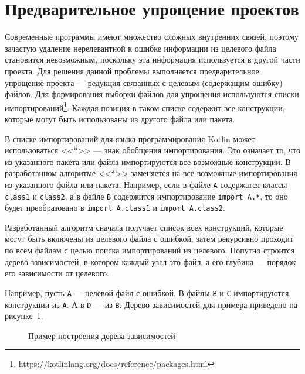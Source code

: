 \section{Предварительное упрощение проектов}
Современные программы имеют множество сложных внутренних связей, поэтому зачастую удаление нерелевантной к ошибке информации из целевого файла становится невозможным, поскольку эта информация используется в другой части проекта. Для решения данной проблемы выполняется предварительное упрощение проекта --- редукция связанных с целевым (содержащим ошибку) файлов. Для формирования выборки файлов для упрощения используются списки импортирований\footnote{https://kotlinlang.org/docs/reference/packages.html}. Каждая позиция в таком списке содержит все конструкции, которые могут быть использованы из другого файла или пакета. 

В списке импортирований для языка программирования Kotlin может использоваться <<*>> --- знак обобщения импортирования. Это означает то, что из указанного пакета или файла импортируются все возможные конструкции. В разработанном алгоритме <<*>> заменяется на все возможные импортирования из указанного файла или пакета. Например, если в файле \texttt{A} содержатся классы \texttt{class1} и \texttt{class2}, а в файле \texttt{B} содержится импортирование \texttt{import A.*}, то оно будет преобразовано в \texttt{import A.class1} и \texttt{import A.class2}. 

Разработанный алгоритм сначала получает список всех конструкций, которые могут быть включены из целевого файла с ошибкой, затем рекурсивно проходит по всем файлам с целью поиска импортирований из целевого. Попутно строится дерево зависимостей, в котором каждый узел это файл, а его глубина --- порядок его зависимости от целевого. 

Например, пусть \texttt{A} --- целевой файл с ошибкой. В файлы \texttt{B} и \texttt{C} импортируются конструкции из \texttt{А}. А в \texttt{D} --- из \texttt{B}. Дерево зависимостей для примера приведено на рисунке~\ref{ex:tree}. 
\begin{figure}
\caption{\label{ex:tree}Пример построения дерева зависимостей}
\end{figure}


